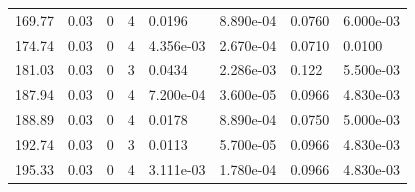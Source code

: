\documentclass[preview]{standalone}
\begin{document}
{{\begin{tabular}{L{1.2cm}C{1.2cm} C{0.3cm}C{0.5cm} C{1.4cm}C{1.4cm} C{1.4cm}C{1.4cm}}
  169.77  &  0.03  & 0     &  4 &  0.0196  & 8.890e-04  & 0.0760 &  6.000e-03   \\ 
  174.74  &  0.03  & 0     &  4 &  4.356e-03  & 2.670e-04  & 0.0710 &  0.0100   \\ 
  181.03  &  0.03  & 0     &  3 &  0.0434  & 2.286e-03  & 0.122 &  5.500e-03   \\ 
  187.94  &  0.03  & 0     &  4 &  7.200e-04  & 3.600e-05  & 0.0966 &  4.830e-03   \\ 
  188.89  &  0.03  & 0     &  4 &  0.0178  & 8.890e-04  & 0.0750 &  5.000e-03   \\ 
  192.74  &  0.03  & 0     &  3 &  0.0113  & 5.700e-05  & 0.0966 &  4.830e-03   \\ 
  195.33  &  0.03  & 0     &  4 &  3.111e-03  & 1.780e-04  & 0.0966 &  4.830e-03   \\ 
\hline 
\end{tabular} 

}}
\end{document}
